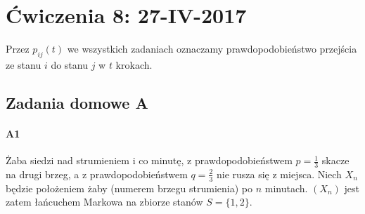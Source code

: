 \section{Ćwiczenia 8: 27-IV-2017}
Przez $p_{ij}(t)$ we wszystkich zadaniach oznaczamy prawdopodobieństwo przejścia ze stanu $i$ do stanu $j$ w $t$ krokach.

\subsection{Zadania domowe A}
\paragraph{A1} Żaba siedzi nad strumieniem i co minutę,
z prawdopodobieństwem $p = \frac{1}{3}$ skacze na drugi brzeg, a z prawdopodobieństwem $q = \frac{2}{3}$ nie rusza się z miejsca. Niech $X_n$ będzie położeniem żaby (numerem brzegu strumienia) po $n$ minutach. $(X_n)$ jest zatem łańcuchem Markowa na zbiorze stanów $S = \{1, 2\}$.
